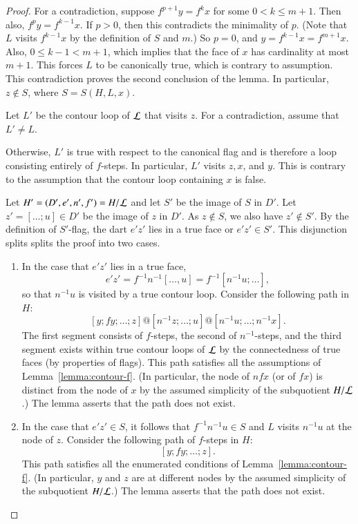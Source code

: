 \begin{proof} 
  For a contradiction, suppose $f^{p+1} y = f^k x$ for some $0<k\le
  m+1$.  Then also, $f^p y = f^{k-1} x$.  If $p>0$, then this
  contradicts the minimality of $p$.  (Note that $L$ visits $f^{k-1}x$
  by the definition of $S$ and $m$.)  So $p=0$, and $y=f^{k-1} x =
  f^{m+1} x$.  Also, $0\le k-1 < {m+1}$, which implies that the face
  of $x$ has cardinality at most $m+1$.  This forces $L$ to be canonically
  true, which is contrary to assumption.  This contradiction proves the second
  conclusion of the lemma.  In particular, $z\not\in S$, where $S =
  S(H,L,x)$.

  Let $L'$ be the contour loop of ${\cal L}$ that visits $z$.  For a
  contradiction, assume that $L'\ne L$.

    Otherwise, $L'$ is true with respect to the
  canonical flag and is therefore a loop consisting entirely of
  $f$-steps.  In particular, $L'$ visits $z,x$, and $y$.  This is
  contrary to the assumption that the contour loop containing $x$ is
  false.

  Let $H' = (D',e',n',f') = H/{\cal L}$ and let $S'$ be the image of
  $S$ in $D'$.  Let $z' = [\ldots;u]\in D'$ be the image of $z$ in
  $D'$.  As $z\not\in S$, we also have $z'\not\in S'$.  By the
  definition of $S'$-flag, the dart $e'z'$ lies in a true face or
  $e'z'\in S'$.  This disjunction splits splits the proof into two
  cases.
\begin{enumerate}
\item In the case that $e'z'$ lies in a true face, 
\[ 
e'z' = f^{-1} n^{-1} [\ldots,u] = f^{-1} [n^{-1}u;\ldots],
\] 
so that $n^{-1} u$ is visited by a true contour loop.
Consider the following
path in $H$:
\[ 
[y;fy;\ldots;z] @ [n^{-1}z;\ldots;u] @ [n^{-1} u;\ldots;n^{-1} x].
\] 
The first segment consists of $f$-steps, the second of $n^{-1}$-steps,
and the third segment exists within true contour loops of ${\cal L}$
by the connectedness of true faces (by properties of flags).  This
path satisfies all the assumptions of Lemma~\ref{lemma:contour-f}.
(In particular, the node of $n f x$ (or of $f x$) is distinct from the
node of $x$ by the assumed simplicity of the subquotient $H/{\cal
  L}$.)  The lemma asserts that the path does not exist.
\item 
In the case that $e'z'\in S$,  it follows that
$f^{-1}n^{-1}u \in S$ and $L$ visits $n^{-1} u$ at the node of $z$.
Consider the following path of $f$-steps in $H$:
\[ 
[y;f y;\ldots;z].
\] 
This path satisfies all the enumerated conditions of
Lemma~\ref{lemma:contour-f}.  (In particular, $y$ and $z$ are at
different nodes by the assumed simplicity of the subquotient $H/{\cal
  L}$.)  The lemma asserts that the path does not exist.
\end{enumerate}
\end{proof}

